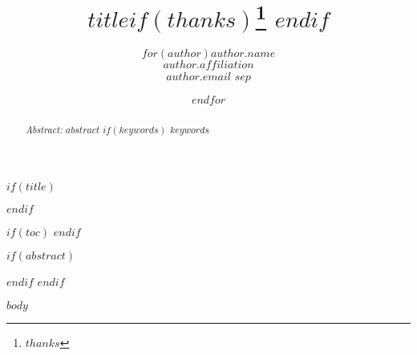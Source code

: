 \documentclass[12pt,article,oneside]{memoir}
\title{\bigskip \bigskip $title$$if(thanks)$\thanks{$thanks$} $endif$ }
\author{$for(author)$\Large $author.name$ \vspace{0.05in} \small \protect\\ \emph{$author.affiliation$} \footnotesize \protect\\ $author.email$ $sep$ \and $endfor$}
\date{}
\begin{document}

$if(title)$
\maketitle
$endif$

$if(toc)$
{
\hypersetup{linkcolor=black}
\setcounter{tocdepth}{$toc-depth$}
\tableofcontents
}
$endif$

$if(abstract)$
\begin{abstract}
\vspace*{-0.75in}\noindent \emph{Abstract:} $abstract$
$if(keywords)$
$keywords$
\end{abstract}
$endif$
$endif$

$body$
\end{document}
